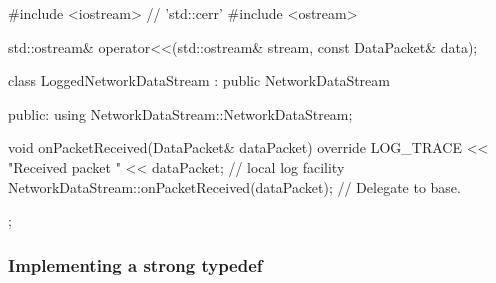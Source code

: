 \begin{emcppshiddenlisting}
#include <iostream> // 'std::cerr'                                              
#include <ostream>                                                              
                                                                                
std::ostream& operator<<(std::ostream& stream, const DataPacket& data);
\end{emcppshiddenlisting}
\begin{emcppslisting}[language=C++]
class LoggedNetworkDataStream : public NetworkDataStream
{
public:
    using NetworkDataStream::NetworkDataStream;

    void onPacketReceived(DataPacket& dataPacket) override
    {
        LOG_TRACE << "Received packet " << dataPacket;    // local log facility
        NetworkDataStream::onPacketReceived(dataPacket);  // Delegate to base.
    }
};
\end{emcppslisting}
    

\subsubsection[Implementing a strong \lstinline!typedef!]{Implementing a strong {\SubsubsecCode typedef}}\label{implementing-a-strong-typedef}

